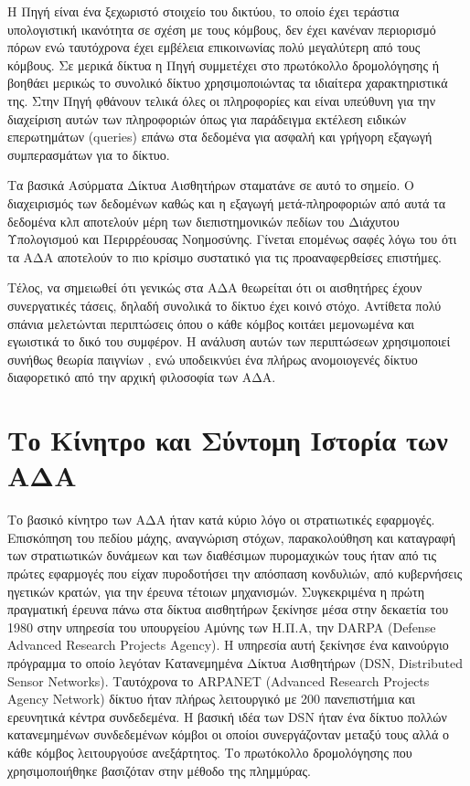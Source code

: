 Η Πηγή είναι ένα ξεχωριστό στοιχείο του δικτύου, το οποίο έχει τεράστια υπολογιστική ικανότητα σε σχέση με τους κόμβους, δεν έχει κανέναν περιορισμό πόρων ενώ
ταυτόχρονα έχει εμβέλεια επικοινωνίας
πολύ μεγαλύτερη από τους κόμβους.
Σε μερικά δίκτυα η Πηγή συμμετέχει στο πρωτόκολλο δρομολόγησης ή βοηθάει μερικώς το συνολικό δίκτυο χρησιμοποιώντας τα ιδιαίτερα χαρακτηριστικά της.
Στην Πηγή φθάνουν τελικά όλες οι πληροφορίες και είναι υπεύθυνη για την διαχείριση αυτών των πληροφοριών όπως για παράδειγμα εκτέλεση ειδικών
επερωτημάτων (queries) επάνω στα δεδομένα για ασφαλή και γρήγορη εξαγωγή συμπερασμάτων για το δίκτυο.

Τα βασικά Ασύρματα Δίκτυα Αισθητήρων σταματάνε σε αυτό το σημείο.
Ο διαχειρισμός των δεδομένων καθώς και η εξαγωγή μετά-πληροφοριών από αυτά τα δεδομένα κλπ αποτελούν μέρη των διεπιστημονικών πεδίων του Διάχυτου Υπολογισμού και
Περιρρέουσας Νοημοσύνης.
Γίνεται επομένως σαφές λόγω του ότι τα ΑΔΑ αποτελούν το πιο κρίσιμο συστατικό για τις προαναφερθείσες επιστήμες.

Τέλος, να σημειωθεί ότι γενικώς στα ΑΔΑ θεωρείται ότι οι αισθητήρες έχουν συνεργατικές τάσεις, δηλαδή συνολικά το δίκτυο έχει κοινό στόχο.
Αντίθετα πολύ σπάνια μελετώνται περιπτώσεις όπου ο κάθε κόμβος κοιτάει μεμονωμένα και εγωιστικά το δικό του συμφέρον.
Η ανάλυση αυτών των περιπτώσεων χρησιμοποιεί συνήθως θεωρία παιγνίων \cite{game_theroy_sensor}, ενώ υποδεικνύει ένα πλήρως ανομοιογενές δίκτυο διαφορετικό από την
αρχική φιλοσοφία των ΑΔΑ.

\section{Το Κίνητρο και Σύντομη Ιστορία των ΑΔΑ} \label{sec:history}
Το βασικό κίνητρο των ΑΔΑ ήταν κατά κύριο λόγο οι στρατιωτικές εφαρμογές.
Επισκόπηση του πεδίου μάχης, αναγνώριση στόχων, παρακολούθηση και καταγραφή των στρατιωτικών δυνάμεων και των διαθέσιμων πυρομαχικών τους ήταν από τις πρώτες
εφαρμογές που είχαν πυροδοτήσει την απόσπαση κονδυλιών, από κυβερνήσεις ηγετικών κρατών, για την έρευνα τέτοιων μηχανισμών.
Συγκεκριμένα η πρώτη πραγματική έρευνα πάνω στα δίκτυα αισθητήρων ξεκίνησε μέσα στην δεκαετία του 1980 στην υπηρεσία του υπουργείου Αμύνης των Η.Π.Α, την DARPA
(Defense Advanced Research Projects Agency).
Η υπηρεσία αυτή ξεκίνησε ένα καινούργιο πρόγραμμα το οποίο λεγόταν Κατανεμημένα Δίκτυα Αισθητήρων (DSN, Distributed Sensor Networks).
Ταυτόχρονα το ARPANET (Advanced Research Projects Agency Network) δίκτυο ήταν πλήρως λειτουργικό με 200 πανεπιστήμια και ερευνητικά κέντρα συνδεδεμένα.
Η βασική ιδέα των DSN ήταν ένα δίκτυο πολλών κατανεμημένων συνδεδεμένων κόμβοι οι οποίοι συνεργάζονταν μεταξύ τους αλλά ο κάθε κόμβος λειτουργούσε ανεξάρτητος.
Το πρωτόκολλο δρομολόγησης που χρησιμοποιήθηκε βασιζόταν στην μέθοδο της πλημμύρας.

